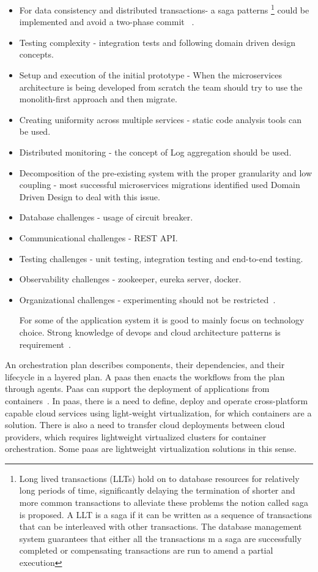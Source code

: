 \begin{itemize}
\item For data consistency and distributed transactions- a saga patterns \footnote{Long lived transactions (LLTs) hold on to database resources for relatively long periods of
time, significantly delaying the termination of shorter and more common transactions to alleviate these problems the notion called saga is proposed. A LLT is a saga if it can be written as a sequence of transactions that can be interleaved with other transactions. The database management system guarantees that either all the transactions m a saga are successfully completed or compensating transactions are run to amend a partial execution} could be implemented and avoid a two-phase commit ~\cite{neves2019}.
\item Testing complexity - integration tests and following domain driven design concepts.
\item Setup and execution of the initial prototype - When the microservices architecture is being developed from scratch the team should try to use the monolith-first approach and then migrate.
\item Creating uniformity across multiple services - static code analysis tools can be used.
\item Distributed monitoring - the concept of Log aggregation should be used.
\item Decomposition of the pre-existing system with the proper granularity and low coupling - most successful microservices migrations identified used Domain Driven Design to deal with this issue.
\item Database challenges - usage of circuit breaker. 
\item Communicational challenges - REST API.
\item Testing challenges - unit testing, integration testing and end-to-end testing.
\item Observability challenges - zookeeper, eureka server, docker.
\item Organizational challenges - experimenting should not be restricted~\cite{Kalske2017, KalskeM2017}.

For some of the application system it is good to mainly focus on technology choice. Strong knowledge of devops and cloud architecture patterns is requirement~\cite{Falatiuk2019}.
\end{itemize}


\par An orchestration plan describes components, their dependencies, and their lifecycle in a layered plan. A paas then enacts the workflows from the plan through agents. Paas can support the deployment of applications from containers~\cite{Sharaf2019}. In paas, there is a need to define, deploy and operate cross-platform capable cloud services using light-weight virtualization, for which containers are a solution. There is also a need to transfer cloud deployments between cloud providers, which requires lightweight virtualized clusters for container orchestration. Some paas are lightweight virtualization solutions in this sense. 

